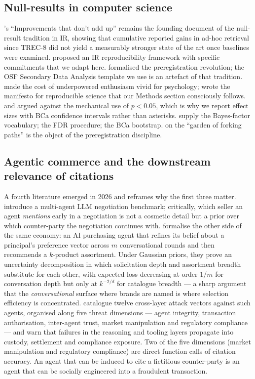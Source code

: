 \documentclass[preprint,12pt,authoryear]{elsarticle}
\begin{document}
\subsection{Null-results in computer science}
\citet{Armstrong2009}'s ``Improvements that don't add up'' remains the founding document of the null-result tradition in IR, showing that cumulative reported gains in ad-hoc retrieval since TREC-8 did not yield a measurably stronger state of the art once baselines were examined. \citet{Ferro2017} proposed an IR reproducibility framework with specific commitments that we adapt here. \citet{Nosek2018} formalised the preregistration revolution; the OSF Secondary Data Analysis template we use is an artefact of that tradition. \citet{OSC2015} made the cost of underpowered enthusiasm vivid for psychology; \citet{Munafo2017} wrote the manifesto for reproducible science that our Methods section consciously follows. \citet{Wasserstein2016} and \citet{Amrhein2019} argued against the mechanical use of $p<0.05$, which is why we report effect sizes with BCa confidence intervals rather than asterisks. \citet{Kass1995} supply the Bayes-factor vocabulary; \citet{Benjamini1995} the FDR procedure; \citet{Efron1987} the BCa bootstrap. \citet{Gelman2014} on the ``garden of forking paths'' is the object of the preregistration discipline.

\subsection{Agentic commerce and the downstream relevance of citations}
A fourth literature emerged in 2026 and reframes why the first three matter. \citet{Liu2026AgenticPay} introduce a multi-agent LLM negotiation benchmark; critically, which seller an agent \emph{mentions} early in a negotiation is not a cosmetic detail but a prior over which counter-party the negotiation continues with. \citet{Cao2026Solicit} formalise the other side of the same economy: an AI purchasing agent that refines its belief about a principal's preference vector across $m$ conversational rounds and then recommends a $k$-product assortment. Under Gaussian priors, they prove an uncertainty decomposition in which solicitation depth and assortment breadth substitute for each other, with expected loss decreasing at order $1/m$ for conversation depth but only at $k^{-2/d}$ for catalogue breadth --- a sharp argument that the \emph{conversational} surface where brands are named is where selection efficiency is concentrated. \citet{Mao2026SoK} catalogue twelve cross-layer attack vectors against such agents, organised along five threat dimensions --- agent integrity, transaction authorisation, inter-agent trust, market manipulation and regulatory compliance --- and warn that failures in the reasoning and tooling layers propagate into custody, settlement and compliance exposure. Two of the five dimensions (market manipulation and regulatory compliance) are direct function calls of citation accuracy. An agent that can be induced to cite a fictitious counter-party is an agent that can be socially engineered into a fraudulent transaction.
\end{document}
